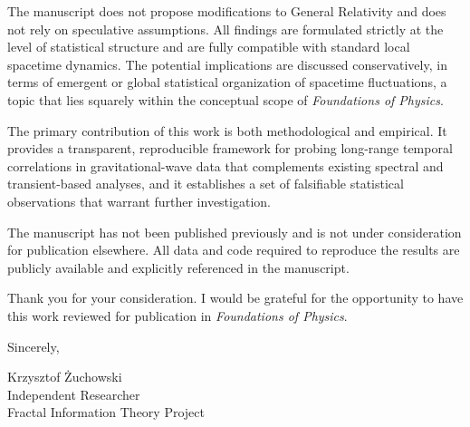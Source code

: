 \documentclass[11pt,a4paper]{article}
\begin{document}
\bigskip

\noindent The manuscript does not propose modifications to General Relativity and does not rely on speculative assumptions. All findings are formulated strictly at the level of statistical structure and are fully compatible with standard local spacetime dynamics. The potential implications are discussed conservatively, in terms of emergent or global statistical organization of spacetime fluctuations, a topic that lies squarely within the conceptual scope of \textit{Foundations of Physics}.

\bigskip

\noindent The primary contribution of this work is both methodological and empirical. It provides a transparent, reproducible framework for probing long-range temporal correlations in gravitational-wave data that complements existing spectral and transient-based analyses, and it establishes a set of falsifiable statistical observations that warrant further investigation.

\bigskip

\noindent The manuscript has not been published previously and is not under consideration for publication elsewhere. All data and code required to reproduce the results are publicly available and explicitly referenced in the manuscript.

\bigskip

\noindent Thank you for your consideration. I would be grateful for the opportunity to have this work reviewed for publication in \textit{Foundations of Physics}.

\bigskip

\noindent Sincerely,

\vspace{1cm}

\noindent Krzysztof Żuchowski \\
Independent Researcher \\
Fractal Information Theory Project
\end{document}
